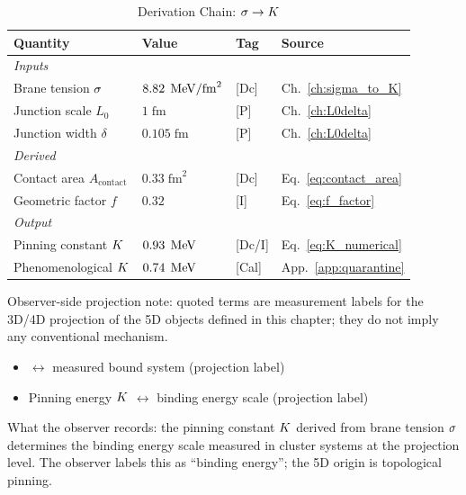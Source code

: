 \begin{table}[htbp]
\centering
\caption{Derivation Chain: $\sigma \to K$}
\label{tab:sigmaK:chain}
\begin{tabular}{llll}
    \toprule
    Quantity & Value & Tag & Source \\
    \midrule
    \multicolumn{4}{l}{\textit{Inputs}} \\
    Brane tension $\sigma$ & $8.82\;\,\mathrm{MeV}/\text{fm}^2$ & [Dc] & Ch.~\ref{ch:sigma_to_K} \\
    Junction scale $L_0$ & $1\;\text{fm}$ & [P] & Ch.~\ref{ch:L0delta} \\
    Junction width $\delta$ & $0.105\;\text{fm}$ & [P] & Ch.~\ref{ch:L0delta} \\
    \midrule
    \multicolumn{4}{l}{\textit{Derived}} \\
    Contact area $A_{\text{contact}}$ & $0.33\;\text{fm}^2$ & [Dc] & Eq.~\eqref{eq:contact_area} \\
    Geometric factor $f$ & $0.32$ & [I] & Eq.~\eqref{eq:f_factor} \\
    \midrule
    \multicolumn{4}{l}{\textit{Output}} \\
    Pinning constant $K$ & $0.93\;\,\mathrm{MeV}$ & [Dc/I] & Eq.~\eqref{eq:K_numerical} \\
    Phenomenological $K$ & $0.74\;\,\mathrm{MeV}$ & [Cal] & App.~\ref{app:quarantine} \\
    \bottomrule
\end{tabular}
\end{table}


\begin{observerbox}
Observer-side projection note: quoted terms are measurement labels for the
3D/4D projection of the 5D objects defined in this chapter; they do not
imply any conventional mechanism.

\begin{itemize}
    \item \ClusterState{} $\leftrightarrow$ measured bound system (projection label)
    \item Pinning energy $K$ $\leftrightarrow$ binding energy scale (projection label)
\end{itemize}

What the observer records: the pinning constant $K$ derived from brane
tension $\sigma$ determines the binding energy scale measured in cluster
systems at the projection level. The observer labels this as ``binding
energy''; the 5D origin is topological pinning.
\end{observerbox}

